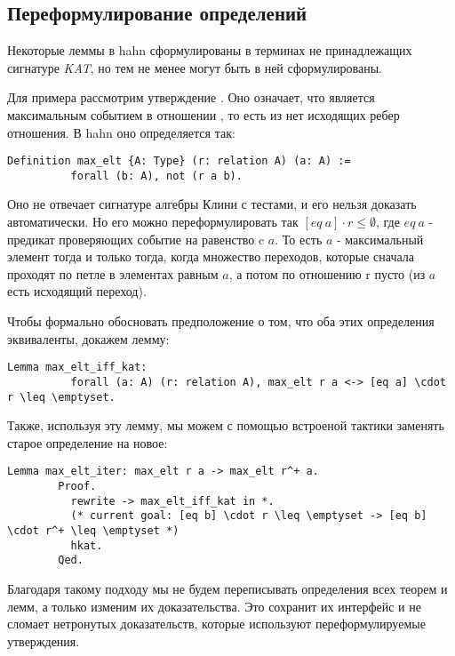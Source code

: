 \documentclass[times
              ]{itmo-student-thesis}
\begin{document}
    \subsection{Переформулирование определений}

      Некоторые леммы в hahn сформулированы в терминах не принадлежащих сигнатуре \textit{KAT}, но тем не менее
      могут быть в ней сформулированы.

      Для примера рассмотрим утверждение .
      Оно означает, что  является максимальным событием в отношении , то есть из  нет исходящих
      ребер отношения. В hahn оно определяется так:

      \begin{lstlisting}[gobble=8]
        Definition max_elt {A: Type} (r: relation A) (a: A) :=
          forall (b: A), not (r a b).
      \end{lstlisting}

      Оно не отвечает сигнатуре алгебры Клини с тестами, и его нельзя доказать автоматически.
      Но его можно переформулировать так $ [eq\ a] \cdot r \le \emptyset $, где $eq\ a$ - предикат проверяющих событие на равенство
      c $a$.
      То есть $ a $ - максимальный элемент тогда и только тогда, когда множество переходов, которые сначала
      проходят по петле в элементах равным $a$, а потом по отношению r пусто (из $a$ есть исходящий переход).

      Чтобы формально обосновать предположение о том, что оба этих определения эквиваленты, докажем лемму:
      \begin{lstlisting}[gobble=8]
        Lemma max_elt_iff_kat:
          forall (a: A) (r: relation A), max_elt r a <-> [eq a] \cdot r \leq \emptyset.
      \end{lstlisting}

      Также, используя эту лемму, мы можем с помощью встроеной тактики  заменять старое определение на новое:

      \begin{lstlisting}[gobble=8]
        Lemma max_elt_iter: max_elt r a -> max_elt r^+ a.
        Proof.
          rewrite -> max_elt_iff_kat in *.
          (* current goal: [eq b] \cdot r \leq \emptyset -> [eq b] \cdot r^+ \leq \emptyset *)
          hkat.
        Qed.
      \end{lstlisting}

      Благодаря такому подходу мы не будем переписывать определения всех теорем и лемм, а только изменим их доказательства.
      Это сохранит их интерфейс и не сломает нетронутых доказательств, которые используют переформулируемые утверждения.
\end{document}
